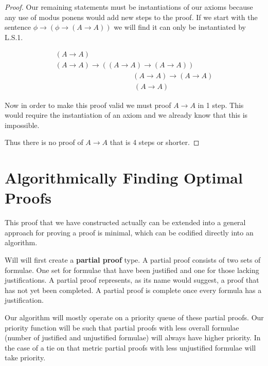 \documentclass{article}
\begin{document}
\begin{proof}
Our remaining statements must be instantiations of our axioms because any use of modus ponens would add new steps to the proof.
If we start with the sentence $\phi \rightarrow (\phi \rightarrow (A \rightarrow A))$ we will find it can only be instantiated by L.S.1.

\begin{gather*}
(A\rightarrow A) \tag{$\gamma$}\\
(A\rightarrow A) \rightarrow ((A\rightarrow A) \rightarrow (A \rightarrow A)) \tag*{L.S.1 ($\delta$)}\\
\phantom{\text{Modus Ponens ($\gamma$, $\delta$) ($\beta$)}} (A\rightarrow A) \rightarrow (A \rightarrow A) \tag*{Modus Ponens ($\gamma$, $\delta$) ($\beta$)} \\
\phantom{\text{Modus Ponens ($\gamma$, $\beta$) ($\alpha$)}} (A \rightarrow A) \tag*{Modus Ponens ($\gamma$, $\beta$) ($\alpha$)}
\end{gather*}

Now in order to make this proof valid we must proof $A \rightarrow A$ in 1 step.
This would require the instantiation of an axiom and we already know that this is impossible.

Thus there is no proof of $A \rightarrow A$ that is 4 steps or shorter.
\end{proof}

\section{Algorithmically Finding Optimal Proofs}

This proof that we have constructed actually can be extended into a general approach for proving a proof is minimal, which can be codified directly into an algorithm.

Will will first create a \textbf{partial proof} type.
A partial proof consists of two sets of formulae.
One set for formulae that have been justified and one for those lacking justifications.
A partial proof represents, as its name would suggest, a proof that has not yet been completed.
A partial proof is complete once every formula has a justification.

Our algorithm will mostly operate on a priority queue of these partial proofs.
Our priority function will be such that partial proofs with less overall formulae (number of justified and unjustified formulae) will always have higher priority.
In the case of a tie on that metric partial proofs with less unjustified formulae will take priority.
\end{document}
